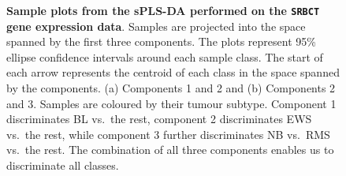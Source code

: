 \documentclass[]{book}
\begin{document}
\begin{figure}

{\centering {}

}

\caption{\textbf{Sample plots from the sPLS-DA performed on
the \texttt{SRBCT} gene expression data}. Samples are projected into the
space spanned by the first three components. The plots represent 95\%
ellipse confidence intervals around each sample class. The start of each
arrow represents the centroid of each class in the space spanned by the
components. (a) Components 1 and 2 and (b) Components 2 and 3. Samples
are coloured by their tumour subtype. Component 1 discriminates BL
vs.~the rest, component 2 discriminates EWS vs.~the rest, while
component 3 further discriminates NB vs.~RMS vs.~the rest. The
combination of all three components enables us to discriminate all
classes.}\label{fig:splsda-indiv}
\end{figure}
\end{document}
